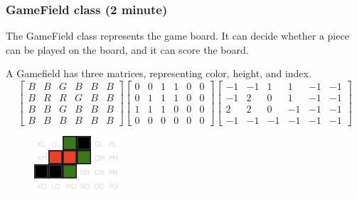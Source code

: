 \documentclass{beamer}
\begin{document}
\begin{frame}
\frametitle{GameField class (2 minute)}
The GameField class represents the game board. It can decide whether a piece can be played on the board, and it can score the board.

A Gamefield has three matrices, representing color, height, and index.
\tiny\[
  \begin{bmatrix}
    B & B & G & B & B & B \\ 
    B & R & R & G & B & B \\ 
    B & B & G & B & B & B \\ 
    B & B & B & B & B & B
  \end{bmatrix}
  \begin{bmatrix}
    0 & 0 & 1 & 1 & 0 & 0 \\ 
    0 & 1 & 1 & 1 & 0 & 0 \\ 
    1 & 1 & 1 & 0 & 0 & 0 \\ 
    0 & 0 & 0 & 0 & 0 & 0
  \end{bmatrix}
  \begin{bmatrix}
    -1 & -1 &  1 &  1 & -1 & -1 \\ 
    -1 &  2 &  0 &  1 & -1 & -1 \\ 
     2 &  2 &  0 & -1 & -1 & -1 \\ 
    -1 & -1 & -1 & -1 & -1 & -1
  \end{bmatrix}
\]
\begin{figure}
\includegraphics[width=0.4\linewidth]{2}
\end{figure}
\end{frame}
\end{document}
